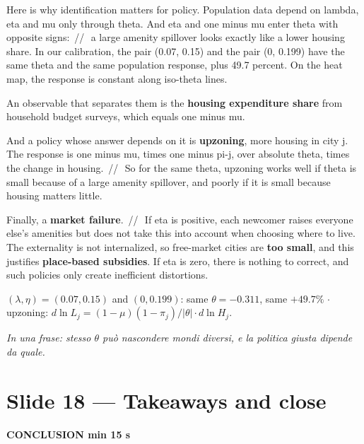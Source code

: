 \documentclass[11pt,a4paper]{article}
\newcommand{\slide}[3]{\Needspace{14\baselineskip}\section{#1}\textcolor{unicared}{\small\bfseries\MakeUppercase{#3}\quad\textperiodcentered\quad #2}\par}
\newcommand{\idea}[1]{\par{\small\itshape\color{unicablue}In una frase: #1}\par}
\newcommand{\pause}{\textcolor{unicared}{\,/\!/\,}}
\begin{document}
\begin{say}
Here is why identification matters for policy. Population data depend on lambda, eta and mu only through theta. And eta and one minus mu enter theta with opposite signs: \pause\ a large amenity spillover looks exactly like a lower housing share. In our calibration, the pair (0.07, 0.15) and the pair (0, 0.199) have the same theta and the same population response, plus 49.7 percent. On the heat map, the response is constant along iso-theta lines.

An observable that separates them is the \textbf{housing expenditure share} from household budget surveys, which equals one minus mu.

And a policy whose answer depends on it is \textbf{upzoning}, more housing in city j. The response is one minus mu, times one minus pi-j, over absolute theta, times the change in housing. \pause\ So for the same theta, upzoning works well if theta is small because of a large amenity spillover, and poorly if it is small because housing matters little.

Finally, a \textbf{market failure}. \pause\ If eta is positive, each newcomer raises everyone else's amenities but does not take this into account when choosing where to live. The externality is not internalized, so free-market cities are \textbf{too small}, and this justifies \textbf{place-based subsidies}. If eta is zero, there is nothing to correct, and such policies only create inefficient distortions.
\end{say}

\begin{nums}
$(\lambda,\eta) = (0.07, 0.15)$ and $(0, 0.199)$: same $\theta = -0.311$, same $+49.7\%$ \quad$\cdot$\quad upzoning: $d\ln L_j = (1-\mu)(1-\pi_j)/|\theta|\cdot d\ln H_j$.
\end{nums}
\idea{stesso $\theta$ può nascondere mondi diversi, e la politica giusta dipende da quale.}

\slide{Slide 18 --- Takeaways and close}{1 min 15 s}{Conclusion}
\end{document}
